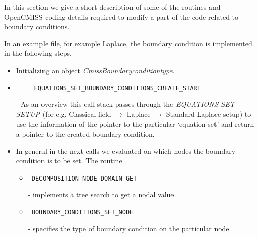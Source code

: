 In this section we give a short description of some of the routines and OpenCMISS coding details required to modify a part of the code related 
to boundary conditions.

In an example file, for example Laplace, the boundary condition is implemented in the following steps,

\begin{itemize}
 \item  Initializing an object \emph{CmissBoundaryconditiontype}.

 \item \begin{verbatim}
     EQUATIONS_SET_BOUNDARY_CONDITIONS_CREATE_START 
    \end{verbatim} 

 - As an overview this call stack passes through the \emph{EQUATIONS SET SETUP} (for e.g. Classical field $\rightarrow$ Laplace
 $\rightarrow$ Standard Laplace setup) to use the information of the pointer to the particular `equation set' and return a pointer to the created boundary condition. 

 \item In general in the next calls we evaluated on which nodes the boundary condition is to be set. The routine 
\begin{itemize}
 \item \begin{verbatim}
 DECOMPOSITION_NODE_DOMAIN_GET
\end{verbatim} - implements a tree search to get a nodal value
 \item \begin{verbatim}
 BOUNDARY_CONDITIONS_SET_NODE
\end{verbatim} - specifies the type of boundary condition on the particular node.

\end{itemize}
 

\end{itemize}
